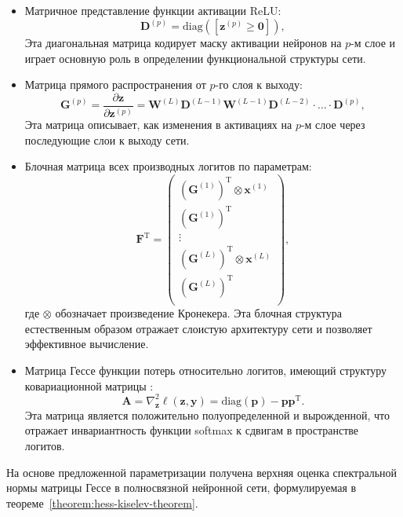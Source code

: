 \begin{itemize}
    \item Матричное представление функции активации ReLU:
    \[
        \mathbf{D}^{(p)} = \mathrm{diag}([\mathbf{z}^{(p)} \geqslant \mathbf{0}]),
    \]
    Эта диагональная матрица кодирует маску активации нейронов на $p$-м слое и играет основную роль в определении функциональной структуры сети.
    
    \item Матрица прямого распространения от $p$-го слоя к выходу:
    \[
        \mathbf{G}^{(p)} = \dfrac{\partial \mathbf{z}}{\partial \mathbf{z}^{(p)}} = \mathbf{W}^{(L)} \mathbf{D}^{(L-1)} \mathbf{W}^{(L-1)} \mathbf{D}^{(L-2)} \cdot \ldots \cdot \mathbf{D}^{(p)}, 
    \]
    Эта матрица описывает, как изменения в активациях на $p$-м слое через последующие слои к выходу сети.
    
    \item Блочная матрица всех производных логитов по параметрам:
    \[
        \mathbf{F}^{\text{T}} =
        \begin{pmatrix}
            (\mathbf{G}^{(1)})^{\text{T}} \otimes \mathbf{x}^{(1)} \\
            (\mathbf{G}^{(1)})^{\text{T}} \\ 
            \vdots \\
            (\mathbf{G}^{(L)})^{\text{T}} \otimes \mathbf{x}^{(L)} \\
            (\mathbf{G}^{(L)})^{\text{T}} \\ 
        \end{pmatrix}, 
    \]
    где $\otimes$ обозначает произведение Кронекера. Эта блочная структура естественным образом отражает слоистую архитектуру сети и позволяет эффективное вычисление.
    
    \item Матрица Гессе функции потерь относительно логитов, имеющий структуру ковариационной матрицы \cite{singla2019understanding}:
    \[
        \mathbf{A} = \nabla^2_\mathbf{z} \ell(\mathbf{z}, \mathbf{y}) = \mathrm{diag}(\mathbf{p}) - \mathbf{p} \mathbf{p}^{\text{T}}.
    \]
    Эта матрица является положительно полуопределенной и вырожденной, что отражает инвариантность функции softmax к сдвигам в пространстве логитов.
\end{itemize}

На основе предложенной параметризации получена верхняя оценка спектральной нормы матрицы Гессе в полносвязной нейронной сети, формулируемая в теореме~\ref{theorem:hess-kiselev-theorem}.

